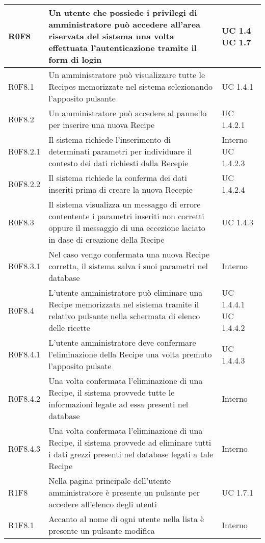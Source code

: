 \begin{center}
\begin{longtable}{| p{2cm} | p{8cm} | p{2cm} |}
		\hline
		R0F8  &  Un utente che possiede i privilegi di amministratore può accedere all'area riservata del sistema una volta effettuata l'autenticazione tramite il form di login  &  UC 1.4 \newline UC 1.7 \\
		\hline
		R0F8.1  &  Un amministratore può visualizzare tutte le Recipes memorizzate nel sistema selezionando l'apposito pulsante  &  UC 1.4.1 \\
		\hline
		R0F8.2  &  Un amministratore può accedere al pannello per inserire una nuova Recipe  &  UC 1.4.2.1 \\
		\hline
		R0F8.2.1  &  Il sistema richiede l'inserimento di determinati parametri per individuare il contesto dei dati richiesti dalla Recepie  &  Interno \newline UC 1.4.2.3 \\
		\hline
		R0F8.2.2  &  Il sistema richiede la conferma dei dati inseriti prima di creare la nuova Recepie  &  UC 1.4.2.4 \\
		\hline
		R0F8.3  &  Il sistema visualizza un messaggo di errore contentente i parametri inseriti non corretti oppure il messaggio di una eccezione laciato in dase di creazione della Recipe  &  UC 1.4.3 \\
		\hline
		R0F8.3.1  &  Nel caso vengo confermata  una nuova Recipe corretta, il sistema salva i suoi parametri nel database  &  Interno \\
		\hline
		R0F8.4  &  L'utente amministratore può eliminare una Recipe memorizzata nel sistema tramite il relativo pulsante nella schermata di elenco delle ricette  &  UC 1.4.4.1 \newline UC 1.4.4.2 \\
		\hline
		R0F8.4.1  &  L'utente amministratore deve confermare l'eliminazione della Recipe una volta premuto l'apposito pulsate  &  UC 1.4.4.3 \\
		\hline
		R0F8.4.2  &  Una volta confermata l'eliminazione di una Recipe, il sistema provvede tutte le informazioni legate ad essa presenti nel database  &  Interno \\
		\hline
		R0F8.4.3  &  Una volta confermata l'eliminazione di una Recipe, il sistema provvede ad eliminare tutti i dati grezzi presenti nel database legati a tale Recipe  &  Interno \\
		\hline
		R1F8  & Nella pagina principale dell'utente amministratore è presente un pulsante per accedere all'elenco degli utenti  &  UC 1.7.1 \\
		\hline
		R1F8.1  &  Accanto al nome di ogni utente nella lista è presente un pulsante modifica  &  Interno \\

\end{longtable}
\end{center}
